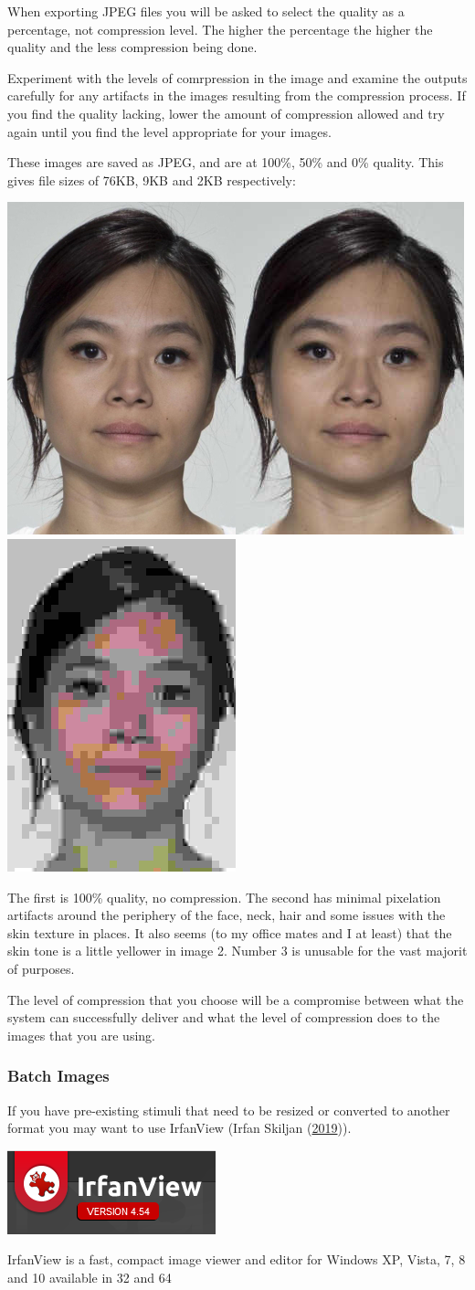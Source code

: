 \documentclass[]{book}
\begin{document}
When exporting JPEG files you will be asked to select the quality as a
percentage, not compression level. The higher the percentage the higher
the quality and the less compression being done.

Experiment with the levels of comrpression in the image and examine the
outputs carefully for any artifacts in the images resulting from the
compression process. If you find the quality lacking, lower the amount
of compression allowed and try again until you find the level
appropriate for your images.

These images are saved as JPEG, and are at 100\%, 50\% and 0\% quality.
This gives file sizes of 76KB, 9KB and 2KB respectively:

\includegraphics{images/screenshots/087_03_min.jpg}\includegraphics{images/screenshots/087_03_mid.jpg}\includegraphics{images/screenshots/087_03_max.jpg}

The first is 100\% quality, no compression. The second has minimal
pixelation artifacts around the periphery of the face, neck, hair and
some issues with the skin texture in places. It also seems (to my office
mates and I at least) that the skin tone is a little yellower in image
2. Number 3 is unusable for the vast majorit of purposes.

The level of compression that you choose will be a compromise between
what the system can successfully deliver and what the level of
compression does to the images that you are using.

\subsubsection{Batch Images}\label{batch-images}

If you have pre-existing stimuli that need to be resized or converted to
another format you may want to use IrfanView (Irfan Skiljan
(\protect\hyperlink{ref-irfanview}{2019})).

\includegraphics{images/screenshots/irfanview_1.png}

IrfanView is a fast, compact image viewer and editor for Windows XP,
Vista, 7, 8 and 10 available in 32 and 64 
\end{document}
